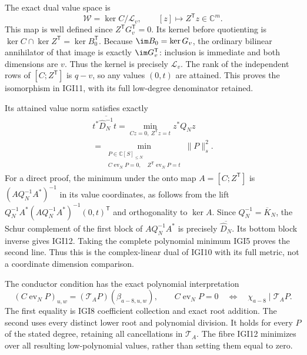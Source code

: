 \documentclass[11pt,a4paper]{article}
\begin{document}
The exact dual value space is
\[
 \mathscr W=\ker C/\mathscr L_v,
 \qquad [z]\longmapsto Z^{\mathsf T}z\in\mathbb C^m.
                                                               \tag{IGI11}
\]
This map is well defined since $Z^{\mathsf T}G_v^{\mathsf T}=0$.
Its kernel before quotienting is
$\ker C\cap\ker Z^{\mathsf T}=\ker B_0^{\mathsf T}$.
Because $\im B_0=\ker G_v$, the ordinary bilinear annihilator
of that image is exactly $\im G_v^{\mathsf T}$: inclusion is
immediate and both dimensions are $v$. Thus the kernel is precisely
$\mathscr L_v$. The rank of the independent rows of
$[C;Z^{\mathsf T}]$ is $q-v$, so any values $(0,t)$ are attained.
This proves the isomorphism in IGI11, with its full low-degree
denominator retained.

Its attained value norm satisfies exactly
\[
\begin{gathered}
 t^*\overline{\widehat D_N^{-1}}t
     =\min_{Cz=0,\ Z^{\mathsf T}z=t} z^*Q_Nz\\
     =\min_{\substack{P\in\mathbb C[S]_{\le N}\\
               C\operatorname{ev}_NP=0,\quad
               Z^{\mathsf T}\operatorname{ev}_NP=t}}\|P\|_s^2.
\end{gathered}                                                    \tag{IGI12}
\]
For a direct proof, the minimum under the onto map
$A=[C;Z^{\mathsf T}]$ is $(AQ_N^{-1}A^*)^{-1}$ in its value
coordinates, as follows from the lift
$Q_N^{-1}A^*(AQ_N^{-1}A^*)^{-1}(0,t)^{\mathsf T}$ and
orthogonality to $\ker A$. Since $Q_N^{-1}=\overline K_N$, the
Schur complement of the first block of $AQ_N^{-1}A^*$ is precisely
$\overline{\widehat D_N}$. Its bottom block inverse gives IGI12.
Taking the complete polynomial minimum IGI5 proves the second line.
Thus this is the complex-linear dual of IGI10 with its full metric,
not a coordinate dimension comparison.

The conductor condition has the exact polynomial interpretation
\[
 (C\operatorname{ev}_NP)_{u,w}
      =(\mathcal T_AP)(\beta_{a-8,u,w}),\qquad
 C\operatorname{ev}_NP=0\quad\Longleftrightarrow\quad
                   \chi_{a-8}\mid\mathcal T_AP .          \tag{IGI13}
\]
The first equality is IGI8 coefficient collection and exact root
addition. The second uses every distinct lower root and polynomial
division. It holds for every $P$ of the stated degree, retaining
all cancellations in $\mathcal T_A$. The fibre IGI12 minimizes
over all resulting low-polynomial values, rather than setting
them equal to zero.
\end{document}
